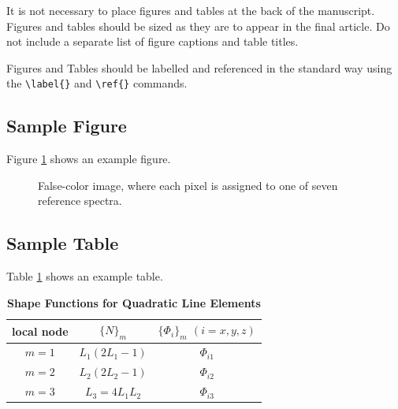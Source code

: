 \documentclass[9pt,twocolumn,twoside]{styles/osajnl}
\begin{document}
It is not necessary to place figures and tables at the back of the
manuscript. Figures and tables should be sized as they are to appear
in the final article. Do not include a separate list of figure
captions and table titles.

Figures and Tables should be labelled and referenced in the standard
way using the \verb|\label{}| and \verb|\ref{}| commands.

\subsection{Sample Figure}

Figure \ref{fig:false-color} shows an example figure.

\begin{figure}[htbp]
\centering
{}
\caption{False-color image, where each pixel is assigned to one of seven reference spectra.}
\label{fig:false-color}
\end{figure}

\subsection{Sample Table}

Table \ref{tab:shape-functions} shows an example table.

\begin{table}[htbp]
\centering
\caption{\bf Shape Functions for Quadratic Line Elements}
\begin{tabular}{ccc}
\hline
local node & $\{N\}_m$ & $\{\Phi_i\}_m$ $(i=x,y,z)$ \\
\hline
$m = 1$ & $L_1(2L_1-1)$ & $\Phi_{i1}$ \\
$m = 2$ & $L_2(2L_2-1)$ & $\Phi_{i2}$ \\
$m = 3$ & $L_3=4L_1L_2$ & $\Phi_{i3}$ \\
\hline
\end{tabular}
  \label{tab:shape-functions}
\end{table}
\end{document}
